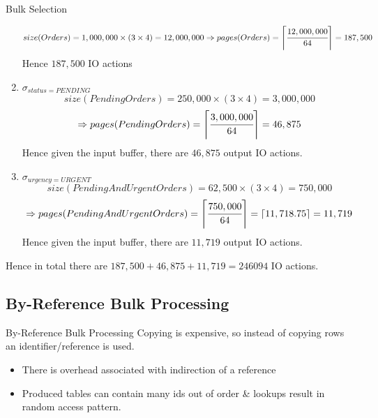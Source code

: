 \begin{examplebox}{Bulk Selection}
\begin{enumerate}
{      \[size(Orders) = 1,000,000 \times (3 \times 4) = 12,000,000 \Rightarrow pages(Orders) = \left\lceil \cfrac{12,000,000}{64} \right\rceil = 187,500 \]
      Hence $187,500$ IO actions
    }
    \item { $\sigma_{status=PENDING}$
      \[size(PendingOrders) = 250,000 \times (3 \times 4) = 3,000,000 \]
      \[\Rightarrow pages(PendingOrders) = \left\lceil \cfrac{3,000,000}{64} \right\rceil = 46,875\]
      Hence given the input buffer, there are $46,875$ output IO actions.
    }
    \item { $\sigma_{urgency=URGENT}$
      \[size(PendingAndUrgentOrders) = 62,500 \times (3 \times 4) = 750,000 \]
      \[\Rightarrow pages(PendingAndUrgentOrders) = \left\lceil \cfrac{750,000}{64} \right\rceil = \lceil 11,718.75 \rceil = 11,719\]
      Hence given the input buffer, there are $11,719$ output IO actions.
    }
  \end{enumerate}
  Hence in total there are $187,500 + 46,875 + 11,719 = 246094$ IO actions.
\end{examplebox}

\subsection{By-Reference Bulk Processing}
\begin{definitionbox}{By-Reference Bulk Processing}
  Copying is expensive, so instead of copying rows an identifier/reference is used.
  \begin{itemize}
    \item There is overhead associated with indirection of a reference
    \item Produced tables can contain many ids out of order \& lookups result in random access pattern.
  \end{itemize}
\end{definitionbox}


